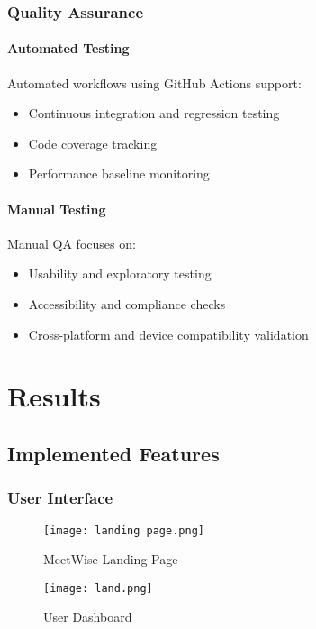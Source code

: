 \documentclass[12pt,a4paper]{report}
\begin{document}
\subsection{Quality Assurance}
\subsubsection*{Automated Testing}
Automated workflows using GitHub Actions support:
\begin{itemize}
    \item Continuous integration and regression testing
    \item Code coverage tracking
    \item Performance baseline monitoring
\end{itemize}

\subsubsection*{Manual Testing}
Manual QA focuses on:
\begin{itemize}
    \item Usability and exploratory testing
    \item Accessibility and compliance checks
    \item Cross-platform and device compatibility validation
\end{itemize}

\chapter{Results}

\section{Implemented Features}

\subsection{User Interface}
\begin{figure}[h!]
    \centering
    \texttt{[image: landing page.png]}
    \caption{MeetWise Landing Page}
    \label{fig:landing}
\end{figure}

\begin{figure}[h!]
    \centering
    \texttt{[image: land.png]}
    \caption{User Dashboard}
    \label{fig:dashboard}
\end{figure}
\end{document}
